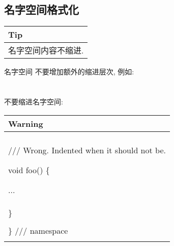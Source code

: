 \documentclass[a4paper,11pt,CJK]{article}
\begin{document}
\begin{CJK}{UTF8}{gbsn}
\subsection{名字空间格式化}
\begin{table}[htbp]
\flushleft
\begin{tabular}{p{400pt}}
\toprule
\rowcolor[gray]{.8} Tip \\
\midrule
名字空间内容不缩进.\\
\bottomrule
\end{tabular}
\end{table}
\noindent
名字空间 不要增加额外的缩进层次, 例如:\\
\\
\\
不要缩进名字空间:\\
\begin{table}[htbp]
\flushleft
\begin{tabular}{p{400pt}}
\toprule
\rowcolor{red} Warning \\
\midrule
\fbox{
\begin{minipage}{400pt}
namespace \{\\
\par
\hspace{3ex}  /// Wrong.  Indented when it should not be.\par
\hspace{3ex}  void foo() \{\par
\hspace{6ex}    ...\\
\hspace{3ex}  \}\\
\\
\}  /// namespace\\
\end{minipage}
}\\
\bottomrule
\end{tabular}
\end{table}

\end{CJK}
\end{document}
